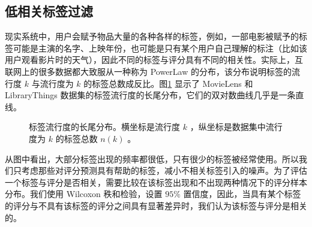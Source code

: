 \subsection{低相关标签过滤}
现实系统中，用户会赋予物品大量的各种各样的标签，例如，一部电影被赋予的标签可能是主演的名字、上映年份，也可能是只有某个用户自己理解的标注（比如该用户观看影片时的天气），因此不同的标签与评分具有不同的相关性。实际上，互联网上的很多数据都大致服从一种称为 PowerLaw 的分布，该分布说明标签的流行度 $k$ 与流行度为 $k$ 的标签总数成反比。图\ref{fig:powerlaw} 显示了 MovieLens 和 LibraryThings 数据集的标签流行度的长尾分布，它们的双对数曲线几乎是一条直线。
\begin{figure}[htbp]
\centering
{}
\caption{标签流行度的长尾分布。横坐标是流行度 $k$ ，纵坐标是数据集中流行度为 $k$ 的标签总数 $n(k)$ 。}
\label{fig:powerlaw}
\end{figure}
从图中看出，大部分标签出现的频率都很低，只有很少的标签被经常使用。所以我们只考虑那些对评分预测具有帮助的标签，减小不相关标签引入的噪声。为了评估一个标签与评分是否相关，需要比较在该标签出现和不出现两种情况下的评分样本分布。我们使用 Wilcoxon 秩和检验，设置 $95\%$ 置信度，因此，当具有某个标签的评分与不具有该标签的评分之间具有显著差异时，我们认为该标签与评分是相关的。

